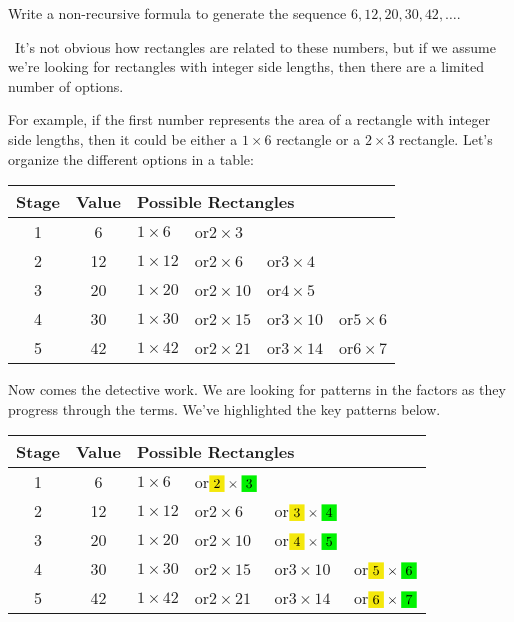 \begin{boxex}
Write a non-recursive formula to generate the sequence $6, 12, 20, 30, 42, \dotsc$.

\exsoln\ It's not obvious how rectangles are related to these numbers, but if we assume we're looking for rectangles with integer side lengths, then there are a limited number of options.

For example, if the first number represents the area of a rectangle with integer side lengths, then it could be either a $1\times6$ rectangle or a $2\times3$ rectangle. Let's organize the different options in a table:

\begin{center}
\begin{tabular}{c|c|llll}
Stage		& Value		& \multicolumn{4}{l}{Possible Rectangles}
\\\hline
1			& 6			& $1 \times 6$
						& or\quad $2 \times 3$
						& ~
\\
2			& 12		& $1 \times 12$
						& or\quad $2 \times 6$
						& or\quad $3 \times 4$
\\
3			& 20		& $1 \times 20$
						& or\quad $2 \times 10$
						& or\quad $4 \times 5$
\\
4			& 30		& $1 \times 30$
						& or\quad $2 \times 15$
						& or\quad $3 \times 10$
						& or\quad $5 \times 6$
\\
5			& 42		& $1 \times 42$
						& or\quad $2 \times 21$
						& or\quad $3 \times 14$
						& or\quad $6 \times 7$
\\
\end{tabular}
\end{center}

Now comes the detective work. We are looking for patterns in the factors as they progress through the terms. We've highlighted the key patterns below.

\begin{center}
\begin{tabular}{c|c|llll}
Stage		& Value		& \multicolumn{4}{l}{Possible Rectangles}
\\\hline
1			& 6			& $1 \times 6$
						& or\quad $\colorbox{yellow!95!black}{2} \times \colorbox{green!95!black}{3}$
						& ~
\\
2			& 12		& $1 \times 12$
						& or\quad $2 \times 6$
						& or\quad $\colorbox{yellow!95!black}{3} \times \colorbox{green!95!black}{4}$
\\
3			& 20		& $1 \times 20$
						& or\quad $2 \times 10$
						& or\quad $\colorbox{yellow!95!black}{4} \times \colorbox{green!95!black}{5}$
\\
4			& 30		& $1 \times 30$
						& or\quad $2 \times 15$
						& or\quad $3 \times 10$
						& or\quad $\colorbox{yellow!95!black}{5} \times \colorbox{green!95!black}{6}$
\\
5			& 42		& $1 \times 42$
						& or\quad $2 \times 21$
						& or\quad $3 \times 14$
						& or\quad $\colorbox{yellow!95!black}{6} \times \colorbox{green!95!black}{7}$
\end{tabular}
\end{center}


\end{boxex}
